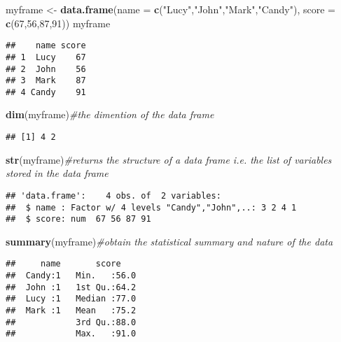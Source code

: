 \documentclass[]{book}
\newenvironment{Shaded}{\begin{snugshade}}{\end{snugshade}}
\newcommand{\KeywordTok}[1]{\textcolor[rgb]{0.13,0.29,0.53}{\textbf{#1}}}
\newcommand{\DataTypeTok}[1]{\textcolor[rgb]{0.13,0.29,0.53}{#1}}
\newcommand{\DecValTok}[1]{\textcolor[rgb]{0.00,0.00,0.81}{#1}}
\newcommand{\StringTok}[1]{\textcolor[rgb]{0.31,0.60,0.02}{#1}}
\newcommand{\CommentTok}[1]{\textcolor[rgb]{0.56,0.35,0.01}{\textit{#1}}}
\newcommand{\NormalTok}[1]{#1}
\theoremstyle{definition}
\theoremstyle{definition}
\theoremstyle{definition}
\theoremstyle{remark}
\begin{document}
\begin{Shaded}
\begin{Highlighting}[]
\NormalTok{myframe <-}\StringTok{ }\KeywordTok{data.frame}\NormalTok{(}\DataTypeTok{name =} \KeywordTok{c}\NormalTok{(}\StringTok{"Lucy"}\NormalTok{,}\StringTok{"John"}\NormalTok{,}\StringTok{"Mark"}\NormalTok{,}\StringTok{"Candy"}\NormalTok{), }\DataTypeTok{score =} \KeywordTok{c}\NormalTok{(}\DecValTok{67}\NormalTok{,}\DecValTok{56}\NormalTok{,}\DecValTok{87}\NormalTok{,}\DecValTok{91}\NormalTok{))}
\NormalTok{myframe}
\end{Highlighting}
\end{Shaded}

\begin{verbatim}
##    name score
## 1  Lucy    67
## 2  John    56
## 3  Mark    87
## 4 Candy    91
\end{verbatim}

\begin{Shaded}
\begin{Highlighting}[]
\KeywordTok{dim}\NormalTok{(myframe)}\CommentTok{#the dimention of the data frame}
\end{Highlighting}
\end{Shaded}

\begin{verbatim}
## [1] 4 2
\end{verbatim}

\begin{Shaded}
\begin{Highlighting}[]
\KeywordTok{str}\NormalTok{(myframe)}\CommentTok{#returns the structure of a data frame i.e. the list of variables stored in the data frame}
\end{Highlighting}
\end{Shaded}

\begin{verbatim}
## 'data.frame':    4 obs. of  2 variables:
##  $ name : Factor w/ 4 levels "Candy","John",..: 3 2 4 1
##  $ score: num  67 56 87 91
\end{verbatim}

\begin{Shaded}
\begin{Highlighting}[]
\KeywordTok{summary}\NormalTok{(myframe)}\CommentTok{#obtain the statistical summary and nature of the data}
\end{Highlighting}
\end{Shaded}

\begin{verbatim}
##     name       score     
##  Candy:1   Min.   :56.0  
##  John :1   1st Qu.:64.2  
##  Lucy :1   Median :77.0  
##  Mark :1   Mean   :75.2  
##            3rd Qu.:88.0  
##            Max.   :91.0
\end{verbatim}
\end{document}
